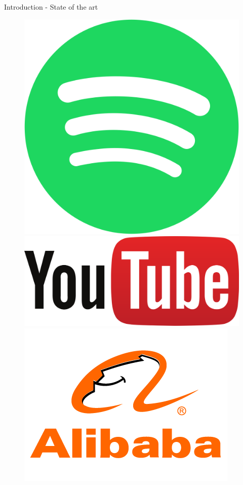 \documentclass{beamer}
\begin{document}
\begin{frame}{Introduction - State of the art}

\begin{figure}[!htb]
  \includegraphics[width=\linewidth, scale=0.3]{images/spotifylogo.png}
\endminipage\hfill
{}
  \includegraphics[width=\linewidth]{images/youtubelogo.png}
\endminipage\hfill
{}%
  \includegraphics[width=\linewidth]{images/ALIBABA-LOGO.png}

\end{figure}
\end{frame}
\end{document}
